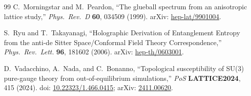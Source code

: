 \documentclass[12pt,a4paper,twoside]{article}
\theoremstyle{plain}
\theoremstyle{definition}
\theoremstyle{remark}
\begin{document}
\begin{thebibliography}{99}
C.~Morningstar and M.~Peardon,
``The glueball spectrum from an anisotropic lattice study,''
\emph{Phys.\ Rev.\ D} \textbf{60}, 034509 (1999).
arXiv: \href{https://arxiv.org/abs/hep-lat/9901004}{hep-lat/9901004}.

S.~Ryu and T.~Takayanagi,
``Holographic Derivation of Entanglement Entropy from the anti-de Sitter
Space/Conformal Field Theory Correspondence,''
\emph{Phys.\ Rev.\ Lett.} \textbf{96}, 181602 (2006).
arXiv: \href{https://arxiv.org/abs/hep-th/0603001}{hep-th/0603001}.

D.~Vadacchino, A.~Nada, and C.~Bonanno,
``Topological susceptibility of SU(3) pure-gauge theory from out-of-equilibrium simulations,''
\emph{PoS} \textbf{LATTICE2024}, 415 (2024).
doi: \href{https://doi.org/10.22323/1.466.0415}{10.22323/1.466.0415};
arXiv: \href{https://arxiv.org/abs/2411.00620}{2411.00620}.

\end{thebibliography}



\end{document}
